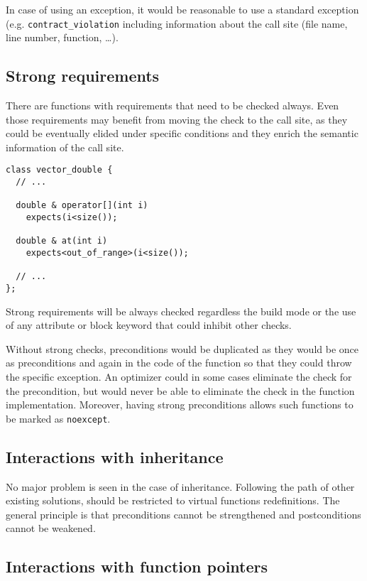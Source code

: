 In case of using an exception, it would be reasonable to use a standard
exception (e.g. \texttt{contract\_violation} including information about the call
site (file name, line number, function, \ldots).

\subsection{Strong requirements}

There are functions with requirements that need to be checked always. Even those
requirements may benefit from moving the check to the call site, as they could
be eventually elided under specific conditions and they enrich the semantic
information of the call site.

\begin{lstlisting}
class vector_double {
  // ...

  double & operator[](int i) 
    expects(i<size());

  double & at(int i)
    expects<out_of_range>(i<size());

  // ...
};
\end{lstlisting}

Strong requirements will be always checked regardless the build mode or the use
of any attribute or block keyword that could inhibit other checks.

Without strong checks, preconditions would be duplicated as they would be once
as preconditions and again in the code of the function so that they could throw
the specific exception. An optimizer could in some cases eliminate the check for
the precondition, but would never be able to eliminate the check in the function
implementation. Moreover, having strong preconditions allows such functions to
be marked as \texttt{noexcept}.

\subsection{Interactions with inheritance}

No major problem is seen in the case of inheritance. Following the path of other
existing solutions, should be restricted to virtual functions redefinitions. The
general principle is that preconditions cannot be strengthened and
postconditions cannot be weakened.

\subsection{Interactions with function pointers}

